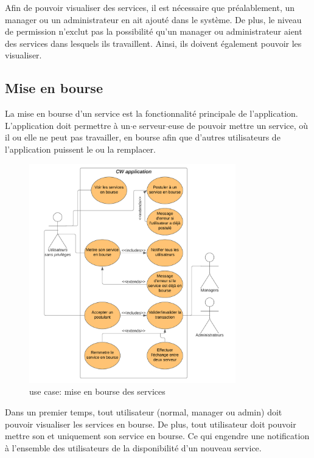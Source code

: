 Afin de pouvoir visualiser des services, il est nécessaire que préalablement, un manager ou un administrateur en ait ajouté dans le système. De plus, le niveau de permission n'exclut pas la possibilité qu'un manager ou administrateur aient des services dans lesquels ils travaillent. Ainsi, ils doivent également pouvoir les visualiser.

\newpage

\subsection*{Mise en bourse}

La mise en bourse d'un service est la fonctionnalité principale de l'application. L'application doit permettre à un$\cdot$e serveur$\cdot$euse de pouvoir mettre un service, où il ou elle ne peut pas travailler, en bourse afin que d'autres utilisateurs de l'application puissent le ou la remplacer.
\begin{figure}[!h]
    \begin{center}
        \includegraphics[width= 0.8\textwidth]{uses cases/BourseUC.png}
    \end{center}
    \caption{use case: mise en bourse des services}
\end{figure}

Dans un premier temps, tout utilisateur (normal, manager ou admin) doit pouvoir visualiser les services en bourse.
De plus, tout utilisateur doit pouvoir mettre son et uniquement son service en bourse. Ce qui engendre une notification à l'ensemble des utilisateurs de la disponibilité d'un nouveau service. 


